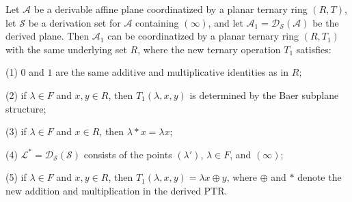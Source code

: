 Let $\mathcal{A}$ be a derivable affine plane coordinatized by a planar ternary ring $(R, T)$, let $\mathcal{S}$ be a derivation set for $\mathcal{A}$ containing $(\infty)$, and let $\mathcal{A}_1 = \mathcal{D}_{\mathcal{S}}(\mathcal{A})$ be the derived plane. Then $\mathcal{A}_1$ can be coordinatized by a planar ternary ring $(R, T_1)$ with the same underlying set $R$, where the new ternary operation $T_1$ satisfies:

(1) $0$ and $1$ are the same additive and multiplicative identities as in $R$;

(2) if $\lambda \in F$ and $x, y \in R$, then $T_1(\lambda, x, y)$ is determined by the Baer subplane structure;

(3) if $\lambda \in F$ and $x \in R$, then $\lambda * x = \lambda x$;

(4) $\mathcal{L}^* = \mathcal{D}_{\mathcal{S}}(\mathcal{S})$ consists of the points $(\lambda')$, $\lambda \in F$, and $(\infty)$;

(5) if $\lambda \in F$ and $x, y \in R$, then $T_1(\lambda, x, y) = \lambda x \oplus y$, where $\oplus$ and $*$ denote the new addition and multiplication in the derived PTR.
